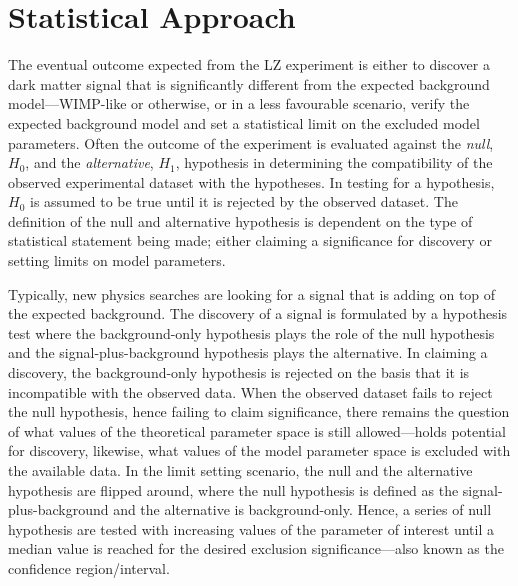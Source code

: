 \section{Statistical Approach}
\label{sec:lz_stats}

The eventual outcome expected from the LZ experiment is either to discover a dark matter signal that is significantly different from the expected background model---WIMP-like or otherwise, or in a less favourable scenario, verify the expected background model and set a statistical limit on the excluded model parameters. Often the outcome of the experiment is evaluated against the \textit{null}, $H_{0}$, and the \textit{alternative}, $H_{1}$, hypothesis in determining the compatibility of the observed experimental dataset with the hypotheses. In testing for a hypothesis, $H_{0}$ is assumed to be true until it is rejected by the observed dataset. The definition of the null and alternative hypothesis is dependent on the type of statistical statement being made; either claiming a significance for discovery or setting limits on model parameters. 

Typically, new physics searches are looking for a signal that is adding on top of the expected background. The discovery of a signal is formulated by a hypothesis test where the background-only hypothesis plays the role of the null hypothesis and the signal-plus-background hypothesis plays the alternative. In claiming a discovery, the background-only hypothesis is rejected on the basis that it is incompatible with the observed data. When the observed dataset fails to reject the null hypothesis, hence failing to claim significance, there remains the question of what values of the theoretical parameter space is still allowed---holds potential for discovery, likewise, what values of the model parameter space is excluded with the available data. In the limit setting scenario, the null and the alternative hypothesis are flipped around, where the null hypothesis is defined as the signal-plus-background and the alternative is background-only. Hence, a series of null hypothesis are tested with increasing values of the parameter of interest until a median value is reached for the desired exclusion significance---also known as the confidence region/interval. 

